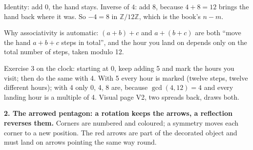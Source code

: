 \documentclass[10pt]{article}
\newcommand{\Z}{\mathbb{Z}}
\begin{document}
{\begin{minipage}[t]{744pt}
\begin{minipage}[t]{330pt}
\par\vspace{4pt}
\raggedright
Identity: add $0$, the hand stays. Inverse of $4$: add $8$, because $4+8=12$ brings the hand back where it was. So $-4=8$ in $\Z/12\Z$, which is the book's $n-m$.
\begin{why}
Why associativity is automatic: $(a+b)+c$ and $a+(b+c)$ are both ``move the hand $a+b+c$ steps in total'', and the hour you land on depends only on the total number of steps, taken modulo 12.
\end{why}
\begin{tryit}
Exercise 3 on the clock: starting at 0, keep adding 5 and mark the hours you visit; then do the same with 4. With 5 every hour is marked (twelve steps, twelve different hours); with 4 only 0, 4, 8 are, because $\gcd(4,12)=4$ and every landing hour is a multiple of 4. Visual page V2, two spreads back, draws both.
\end{tryit}
\end{minipage}\hfill
\begin{minipage}[t]{400pt}\vspace{0pt}
{\sffamily\bfseries 2. The arrowed pentagon: a rotation keeps the arrows, a reflection reverses them.} Corners are numbered and coloured; a symmetry moves each corner to a new position. The red arrows are part of the decorated object and must land on arrows pointing the same way round.\par\vspace{4pt}

\end{minipage}
\end{minipage}}
\end{document}
